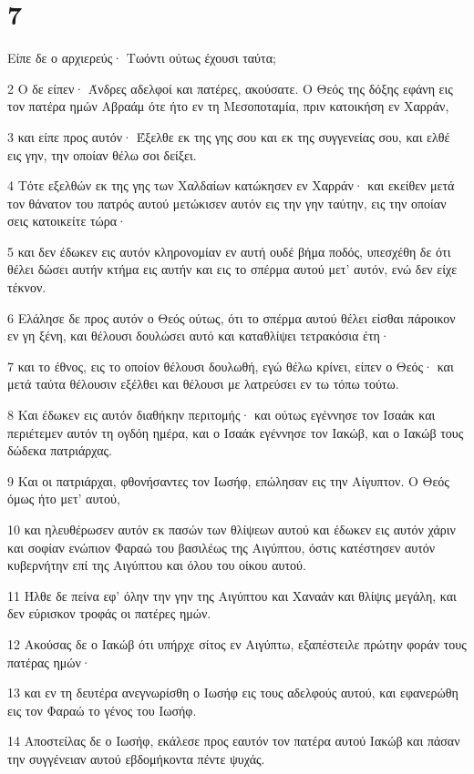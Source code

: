 \chapter{7}

\par Είπε δε ο αρχιερεύς· Τωόντι ούτως έχουσι ταύτα;
\par 2 Ο δε είπεν· Άνδρες αδελφοί και πατέρες, ακούσατε. Ο Θεός της δόξης εφάνη εις τον πατέρα ημών Αβραάμ ότε ήτο εν τη Μεσοποταμία, πριν κατοικήση εν Χαρράν,
\par 3 και είπε προς αυτόν· Έξελθε εκ της γης σου και εκ της συγγενείας σου, και ελθέ εις γην, την οποίαν θέλω σοι δείξει.
\par 4 Τότε εξελθών εκ της γης των Χαλδαίων κατώκησεν εν Χαρράν· και εκείθεν μετά τον θάνατον του πατρός αυτού μετώκισεν αυτόν εις την γην ταύτην, εις την οποίαν σεις κατοικείτε τώρα·
\par 5 και δεν έδωκεν εις αυτόν κληρονομίαν εν αυτή ουδέ βήμα ποδός, υπεσχέθη δε ότι θέλει δώσει αυτήν κτήμα εις αυτήν και εις το σπέρμα αυτού μετ' αυτόν, ενώ δεν είχε τέκνον.
\par 6 Ελάλησε δε προς αυτόν ο Θεός ούτως, ότι το σπέρμα αυτού θέλει είσθαι πάροικον εν γη ξένη, και θέλουσι δουλώσει αυτό και καταθλίψει τετρακόσια έτη·
\par 7 και το έθνος, εις το οποίον θέλουσι δουλωθή, εγώ θέλω κρίνει, είπεν ο Θεός· και μετά ταύτα θέλουσιν εξέλθει και θέλουσι με λατρεύσει εν τω τόπω τούτω.
\par 8 Και έδωκεν εις αυτόν διαθήκην περιτομής· και ούτως εγέννησε τον Ισαάκ και περιέτεμεν αυτόν τη ογδόη ημέρα, και ο Ισαάκ εγέννησε τον Ιακώβ, και ο Ιακώβ τους δώδεκα πατριάρχας.
\par 9 Και οι πατριάρχαι, φθονήσαντες τον Ιωσήφ, επώλησαν εις την Αίγυπτον. Ο Θεός όμως ήτο μετ' αυτού,
\par 10 και ηλευθέρωσεν αυτόν εκ πασών των θλίψεων αυτού και έδωκεν εις αυτόν χάριν και σοφίαν ενώπιον Φαραώ του βασιλέως της Αιγύπτου, όστις κατέστησεν αυτόν κυβερνήτην επί της Αιγύπτου και όλου του οίκου αυτού.
\par 11 Ήλθε δε πείνα εφ' όλην την γην της Αιγύπτου και Χαναάν και θλίψις μεγάλη, και δεν εύρισκον τροφάς οι πατέρες ημών.
\par 12 Ακούσας δε ο Ιακώβ ότι υπήρχε σίτος εν Αιγύπτω, εξαπέστειλε πρώτην φοράν τους πατέρας ημών·
\par 13 και εν τη δευτέρα ανεγνωρίσθη ο Ιωσήφ εις τους αδελφούς αυτού, και εφανερώθη εις τον Φαραώ το γένος του Ιωσήφ.
\par 14 Αποστείλας δε ο Ιωσήφ, εκάλεσε προς εαυτόν τον πατέρα αυτού Ιακώβ και πάσαν την συγγένειαν αυτού εβδομήκοντα πέντε ψυχάς.
